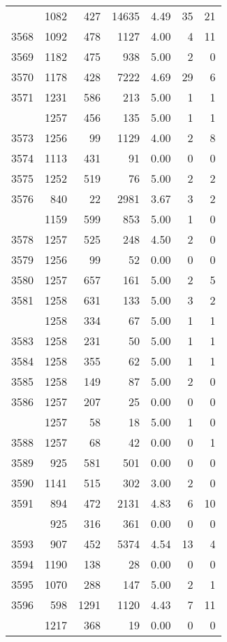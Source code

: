 \documentclass[
]{article}
\begin{document}
\begin{table}
\begin{tabular}[t]{lrrrrrr}
\addlinespace
3567 & 1082 & 427 & 14635 & 4.49 & 35 & 21\\
3568 & 1092 & 478 & 1127 & 4.00 & 4 & 11\\
3569 & 1182 & 475 & 938 & 5.00 & 2 & 0\\
3570 & 1178 & 428 & 7222 & 4.69 & 29 & 6\\
3571 & 1231 & 586 & 213 & 5.00 & 1 & 1\\
\addlinespace
3572 & 1257 & 456 & 135 & 5.00 & 1 & 1\\
3573 & 1256 & 99 & 1129 & 4.00 & 2 & 8\\
3574 & 1113 & 431 & 91 & 0.00 & 0 & 0\\
3575 & 1252 & 519 & 76 & 5.00 & 2 & 2\\
3576 & 840 & 22 & 2981 & 3.67 & 3 & 2\\
\addlinespace
3577 & 1159 & 599 & 853 & 5.00 & 1 & 0\\
3578 & 1257 & 525 & 248 & 4.50 & 2 & 0\\
3579 & 1256 & 99 & 52 & 0.00 & 0 & 0\\
3580 & 1257 & 657 & 161 & 5.00 & 2 & 5\\
3581 & 1258 & 631 & 133 & 5.00 & 3 & 2\\
\addlinespace
3582 & 1258 & 334 & 67 & 5.00 & 1 & 1\\
3583 & 1258 & 231 & 50 & 5.00 & 1 & 1\\
3584 & 1258 & 355 & 62 & 5.00 & 1 & 1\\
3585 & 1258 & 149 & 87 & 5.00 & 2 & 0\\
3586 & 1257 & 207 & 25 & 0.00 & 0 & 0\\
\addlinespace
3587 & 1257 & 58 & 18 & 5.00 & 1 & 0\\
3588 & 1257 & 68 & 42 & 0.00 & 0 & 1\\
3589 & 925 & 581 & 501 & 0.00 & 0 & 0\\
3590 & 1141 & 515 & 302 & 3.00 & 2 & 0\\
3591 & 894 & 472 & 2131 & 4.83 & 6 & 10\\
\addlinespace
3592 & 925 & 316 & 361 & 0.00 & 0 & 0\\
3593 & 907 & 452 & 5374 & 4.54 & 13 & 4\\
3594 & 1190 & 138 & 28 & 0.00 & 0 & 0\\
3595 & 1070 & 288 & 147 & 5.00 & 2 & 1\\
3596 & 598 & 1291 & 1120 & 4.43 & 7 & 11\\
\addlinespace
3597 & 1217 & 368 & 19 & 0.00 & 0 & 0\\

\end{tabular}
\end{table}
\end{document}
